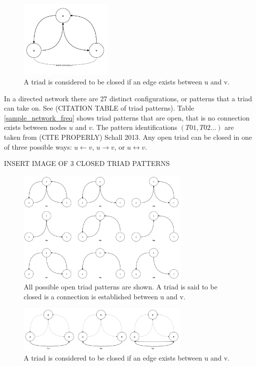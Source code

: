 \begin{figure}[H]
  \centering
  \includegraphics[width=0.4\textwidth]{images/thesis_triad_example.png}
  \caption[closed triad patterns]{A triad is considered to be closed if an edge exists between u and v.}
  \label{thesis_closed_triads}
\end{figure}


In a directed network there are 27 distinct configurations, or patterns that a triad can take on. See (CITATION TABLE of triad patterns). Table \ref{sample_network_freq} shows triad patterns that are open, that is no connection exists between nodes $u$ and $v$. The pattern identifications $(T01, T02...)$ are taken from (CITE PROPERLY) Schall 2013. Any open triad can be closed in one of three possible ways: $u \leftarrow v$, $u \rightarrow v$, or $u \leftrightarrow v$.

INSERT IMAGE OF 3 CLOSED TRIAD PATTERNS 
\begin{figure}[H]
  \centering
  \includegraphics[width=0.75\textwidth]{images/thesis_triad_patterns.png}
  \caption[triad patterns]{All possible open triad patterns are shown. A triad is said to be closed is a connection is established between u and v.}
  \label{thesis_triad_patterns}
\end{figure}

\begin{figure}[H]
  \centering
  \includegraphics[width=0.75\textwidth]{images/thesis_closed_triads.png}
  \caption[closed triad patterns]{A triad is considered to be closed if an edge exists between u and v.}
  \label{thesis_closed_triads}
\end{figure}

